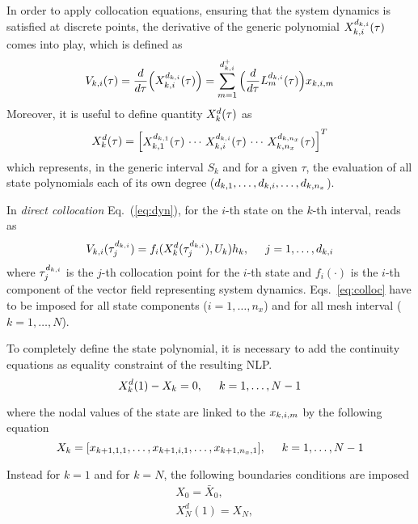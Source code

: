 In order to apply collocation equations, ensuring that the system dynamics is satisfied at discrete points, the derivative of the generic polynomial $X_{k,i}^{d_{k,i}} (\tau)$ comes into play, which is defined as
\begin{equation}
V_{k,i} (\tau) = \frac{d}{d\tau}\Big(X_{k,i}^{d_{k,i}}(\tau)\Big) = \sum_{m=1}^{d_{k,i}^{+}}\Big(\frac{d}{d\tau}L_{m}^{d_{k,i}}(\tau)\Big)x_{k,i,m}
\end{equation}
Moreover, it is useful to define quantity $X_{k}^{d} (\tau)$ as
\begin{equation}
X_{k}^{d}(\tau) =
\begin{bmatrix}
X_{k,1}^{d_{k,1}}(\tau)\, \cdots \, X_{k,i}^{d_{k,i}}(\tau) \, \cdots\, 
X_{k,n_x}^{d_{k,n_x}}(\tau)
\end{bmatrix}^T
\end{equation}
which represents, in the generic interval $S_k$ and for a given $\tau$, the evaluation of all state polynomials each of its own degree ($d_{k,1}, \dots, d_{k,i}, \dots, d_{k,n_{x}}$).

In \emph{direct collocation} Eq.~(\ref{eq:dyn}), for the $i$-th state on the $k$-th interval, reads as
\begin{equation}\label{eq:colloc}
V_{k,i}(\tau_{j}^{d_{k,i}}) = f_i(X_{k}^{d}(\tau_{j}^{d_{k,i}}),  U_k) h_{k}, \hspace{5mm} j = 1, \dots, d_{k,i}
\end{equation}
where $\tau_{j}^{d_{k,i}}$ is the $j$-th collocation point for the $i$-th state and $f_i(\cdot)$ is the $i$-th component of the vector field representing system dynamics. Eqs.~\eqref{eq:colloc} have to be imposed for all state components ($i = 1, \dots, n_x$) and for all mesh interval ($k = 1, \dots, N$).

To completely define the state polynomial, it is necessary to add the continuity equations  as equality constraint of the resulting NLP.    
\begin{equation}\label{eq:continuity}
X_{k}^{d}(1) - X_k = 0, \hspace{5mm} k = 1, \dots, N-1
\end{equation}

where the nodal values of the state are linked to the $x_{k,i,m}$ by the following equation
\begin{equation}
X_k = [x_{k+1,1,1}, \dots, x_{k+1,i,1}, \dots, x_{k+1,n_{x},1}], \hspace{5mm} k = 1, \dots, N-1
\end{equation}

Instead for $k = 1$ and for $k = N$, the following boundaries conditions are imposed
\begin{subequations}
	\begin{align}
	& X_{0} = \bar{X}_{0} \label{eq:intial},\\
	& X_{N}^{d}(1) = X_N \label{eq:final},
	\end{align}
\end{subequations} 

